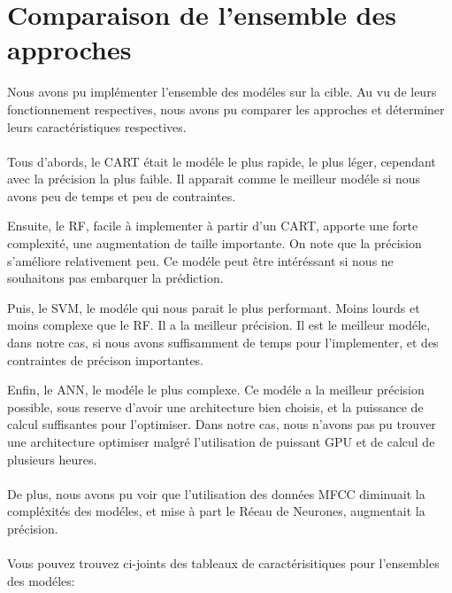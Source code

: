 \documentclass[10pt]{article}
\begin{document}
\section{Comparaison de l'ensemble des approches}

Nous avons pu implémenter l'ensemble des modéles sur la cible. Au vu de leurs fonctionnement respectives, nous avons pu comparer les approches et déterminer leurs caractéristiques respectives. \\ \\

 Tous d'abords, le CART était le modéle le plus rapide, le plus léger, cependant avec la précision la plus faible. Il apparait comme le meilleur modéle si nous avons peu de temps et peu de contraintes. 
 
 Ensuite, le RF, facile à implementer à partir d'un CART, apporte une forte complexité, une augmentation de taille importante. On note que la précision s'améliore relativement peu. Ce modéle peut être intéréssant si nous ne souhaitons pas embarquer la prédiction.

Puis, le SVM, le modéle qui nous parait le plus performant. Moins lourds et moins complexe que le RF. Il a la meilleur précision. Il est le meilleur modéle, dans notre cas, si nous avons suffisamment de temps pour l'implementer, et des contraintes de précison importantes.

Enfin, le ANN, le modéle le plus complexe. Ce modéle a la meilleur précision possible, sous reserve d'avoir une architecture bien choisis, et la puissance de calcul suffisantes pour l'optimiser. Dans notre cas, nous n'avons pas pu trouver une architecture optimiser malgré l'utilisation de puissant GPU et de calcul de plusieurs heures. \\ \\

De plus, nous avons pu voir que l'utilisation des données MFCC diminuait la compléxités des modéles, et mise à part le Réeau de Neurones, augmentait la précision.\\\\

Vous pouvez trouvez ci-joints des tableaux de caractérisitiques pour l'ensembles des modéles:\\
\end{document}
